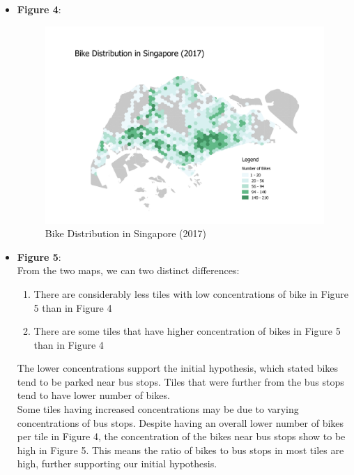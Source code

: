 \documentclass[a4paper, fleqn]{article}
\begin{document}
\begin{itemize}
\pagebreak
\item \textbf{Figure 4}:\\
\begin{figure}[h!]
\includegraphics[width=\linewidth]{./assets/201802091838.png}
\caption{Bike Distribution in Singapore (2017)}
\label{figure:map4}
\end{figure}
\pagebreak
\item \textbf{Figure 5}:\\
From the two maps, we can two distinct differences:\begin{enumerate}
\item There are considerably less tiles with low concentrations of bike in Figure 5 than in Figure 4
\item There are some tiles that have higher concentration of bikes in Figure 5 than in Figure 4
\end{enumerate}
The lower concentrations support the initial hypothesis, which stated bikes tend to be parked near bus stops. Tiles that were further from the bus stops tend to have lower number of bikes.\\
Some tiles having increased concentrations may be due to varying concentrations of bus stops. Despite having an overall lower number of bikes per tile in Figure 4, the concentration of the bikes near bus stops show to be high in Figure 5. This means the ratio of bikes to bus stops in most tiles are high, further supporting our initial hypothesis.
\begin{figure}[h!]

\end{figure}
\end{itemize}
\end{document}
